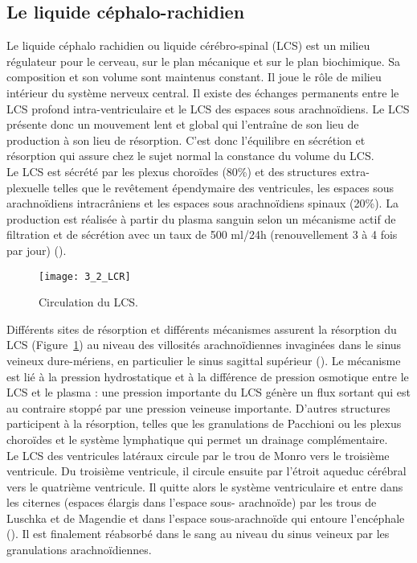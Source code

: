 \subsection{Le liquide céphalo-rachidien}
Le liquide céphalo rachidien ou liquide cérébro-spinal (LCS) est un milieu régulateur pour le
cerveau, sur le plan mécanique et sur le plan biochimique. Sa composition et son volume sont
maintenus constant. Il joue le rôle de milieu intérieur du système nerveux central. Il existe des
échanges permanents entre le LCS profond intra-ventriculaire et le LCS des espaces sous
arachnoïdiens. Le LCS présente donc un mouvement lent et global qui l’entraîne de son lieu de
production à son lieu de résorption. C’est donc l’équilibre en sécrétion et résorption qui assure chez le
sujet normal la constance du volume du LCS.\\
Le LCS est sécrété par les plexus choroïdes (80\%) et des structures extra-plexuelle telles que le
revêtement épendymaire des ventricules, les espaces sous arachnoïdiens intracrâniens et les espaces
sous arachnoïdiens spinaux (20\%). La production est réalisée à partir du plasma sanguin selon un
mécanisme actif de filtration et de sécrétion avec un taux de 500 ml/24h (renouvellement 3 à 4 fois
par jour) (\cite{Maurer2010}).\\
\begin{figure}[!t]
\centering
\texttt{[image: 3\_2\_LCR]}
\caption{Circulation du LCS.}
\label{fig:3_2_LCR}	
\end{figure}
Différents sites de résorption et différents mécanismes assurent la résorption du LCS (Figure~\ref{fig:3_2_LCR}) au niveau des villosités arachnoïdiennes invaginées dans le sinus veineux dure-mériens, en
particulier le sinus sagittal supérieur (\cite{Segal2001}). Le mécanisme est lié à la pression hydrostatique et à la
différence de pression osmotique entre le LCS et le plasma : une pression importante du LCS génère
un flux sortant qui est au contraire stoppé par une pression veineuse importante. D’autres structures participent à la résorption, telles que les granulations de Pacchioni ou les plexus choroïdes et le
système lymphatique qui permet un drainage complémentaire.\\
Le LCS des ventricules latéraux circule par le trou de Monro vers le troisième ventricule. Du
troisième ventricule, il circule ensuite par l’étroit aqueduc cérébral vers le quatrième ventricule. Il
quitte alors le système ventriculaire et entre dans les citernes (espaces élargis dans l’espace sous-
arachnoïde) par les trous de Luschka et de Magendie et dans l’espace sous-arachnoïde qui entoure
l’encéphale (\cite{Bernard2007}). Il est finalement réabsorbé dans le sang au niveau du sinus veineux par les
granulations arachnoïdiennes.
